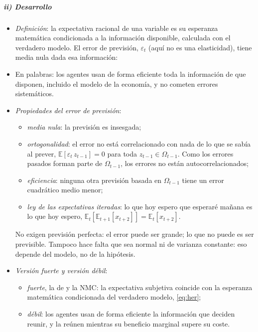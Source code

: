 \documentclass[11pt]{article}
\begin{document}
\subparagraph{ii) Desarrollo}

\begin{itemize}
\item \emph{Definición}: la expectativa racional de una variable es su esperanza matemática condicionada a la información disponible, calculada con el verdadero modelo. El error de previsión, $\varepsilon_t$ (aquí no es una elasticidad), tiene media nula dada esa información:
\item En palabras: los agentes usan de forma eficiente toda la información de que disponen, incluido el modelo de la economía, y no cometen errores sistemáticos.
\item \emph{Propiedades del error de previsión}:
  \begin{itemize}
  \item \emph{media nula}: la previsión es insesgada;
  \item \emph{ortogonalidad}: el error no está correlacionado con nada de lo que se sabía al prever, $\mathbb{E}[\varepsilon_t\,z_{t-1}]=0$ para toda $z_{t-1}\in\Omega_{t-1}$. Como los errores pasados forman parte de $\Omega_{t-1}$, los errores no están autocorrelacionados;
  \item \emph{eficiencia}: ninguna otra previsión basada en $\Omega_{t-1}$ tiene un error cuadrático medio menor;
  \item \emph{ley de las expectativas iteradas}: lo que hoy espero que esperaré mañana es lo que hoy espero, $\mathbb{E}_t\left[\mathbb{E}_{t+1}[x_{t+2}]\right]=\mathbb{E}_t[x_{t+2}]$.
  \end{itemize}
  No exigen previsión perfecta: el error puede ser grande; lo que no puede es ser previsible. Tampoco hace falta que sea normal ni de varianza constante: eso depende del modelo, no de la hipótesis.
\item \emph{Versión fuerte y versión débil}\nocite{SnowdonVane2005Modern}:
  \begin{itemize}
  \item \emph{fuerte}, la de  y la NMC: la expectativa subjetiva coincide con la esperanza matemática condicionada del verdadero modelo, \eqref{eq:her};
  \item \emph{débil}: los agentes usan de forma eficiente la información que deciden reunir, y la reúnen mientras su beneficio marginal supere su coste.
  \end{itemize}

\end{itemize}
\end{document}
